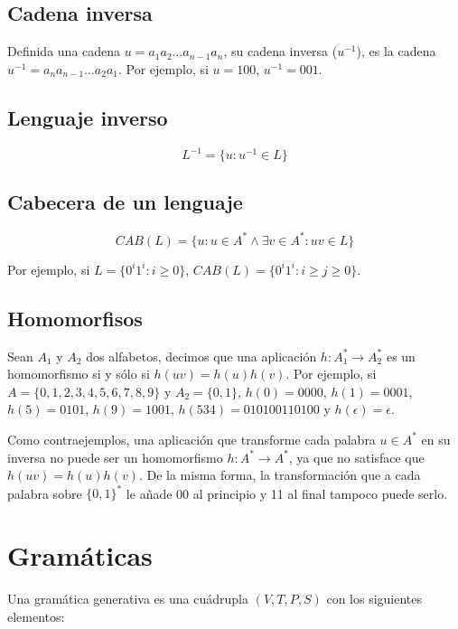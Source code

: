 \subsection{Cadena inversa}

Definida una cadena $u = a_1 a_2 \ldots a_{n-1} a_n$, su cadena inversa ($u^{-1}$), es la cadena $u^{-1} = a_n a_{n-1} \ldots a_2a_1$.
Por ejemplo, si $u = 100$, $u^{-1} = 001$.

\subsection{Lenguaje inverso}

\[L^{-1} = \{u : u^{-1} \in L\}\]

\subsection{Cabecera de un lenguaje}

\[CAB(L) = \{u : u \in A^* \land \exists v \in A^* : uv \in L\}\]

Por ejemplo, si $L = \{0^i 1^i : i \geq 0\}$, $CAB(L) = \{0^i 1^i : i \geq j \geq 0\}$.

\subsection{Homomorfisos}

Sean $A_1$ y $A_2$ dos alfabetos, decimos que una aplicación $h : A^*_1 \rightarrow A^*_2$ es un homomorfismo si y sólo si $h(uv) = h(u) h(v)$.
Por ejemplo, si $A = \{0,1,2,3,4,5,6,7,8,9\}$ y $A_2 = \{0,1\}$, $h(0) = 0000$, $h(1) = 0001$, $h(5) = 0101$, $h(9) = 1001$, $h(534) = 010100110100$ y $h(\epsilon) = \epsilon$.

Como contraejemplos, una aplicación que transforme cada palabra $u \in A^*$ en su inversa no puede ser un homomorfismo $h : A^* \rightarrow A^*$, ya que no satisface que $h(uv) = h(u) h(v)$.
De la misma forma, la transformación que a cada palabra sobre ${\{0,1\}}^*$ le añade 00 al principio y 11 al final tampoco puede serlo.

\section{Gramáticas}

Una gramática generativa es una cuádrupla $(V, T, P, S)$ con los siguientes elementos:

